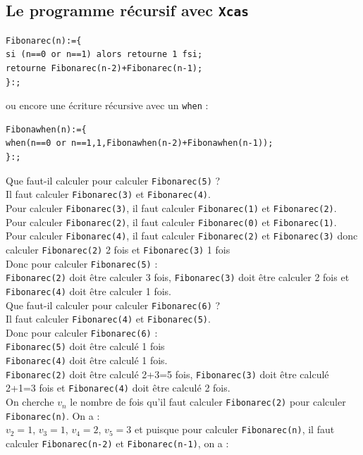 \documentclass[a4paper,11pt]{book}
\begin{document}
\subsection{Le programme r\'ecursif avec {\tt Xcas}}
\begin{verbatim}
Fibonarec(n):={
si (n==0 or n==1) alors retourne 1 fsi;
retourne Fibonarec(n-2)+Fibonarec(n-1);
}:;
\end{verbatim}
ou encore une \'ecriture r\'ecursive avec un {\tt when} :
\begin{verbatim}
Fibonawhen(n):={
when(n==0 or n==1,1,Fibonawhen(n-2)+Fibonawhen(n-1));
}:;
\end{verbatim}
Que faut-il calculer pour calculer {\tt Fibonarec(5)} ?\\
Il faut calculer {\tt Fibonarec(3)} et  {\tt Fibonarec(4)}.\\
Pour calculer {\tt Fibonarec(3)}, il faut calculer {\tt Fibonarec(1)} et  {\tt Fibonarec(2)}.\\
Pour calculer {\tt Fibonarec(2)}, il faut calculer {\tt Fibonarec(0)} et  {\tt Fibonarec(1)}.\\
Pour calculer {\tt Fibonarec(4)}, il faut calculer {\tt Fibonarec(2)} et  {\tt Fibonarec(3)} donc
calculer {\tt Fibonarec(2)} 2 fois et {\tt Fibonarec(3)} 1 fois\\
Donc pour calculer {\tt Fibonarec(5)} :\\
{\tt Fibonarec(2)} doit \^etre calculer 3 fois, {\tt Fibonarec(3)} doit \^etre 
calculer 2 fois et {\tt Fibonarec(4)} doit \^etre calculer 1 fois.\\
Que faut-il calculer pour calculer {\tt Fibonarec(6)} ?\\
Il faut calculer {\tt Fibonarec(4)} et  {\tt Fibonarec(5)}.\\
Donc  pour calculer {\tt Fibonarec(6)} :\\
{\tt Fibonarec(5)} doit \^etre calculé 1 fois \\
{\tt Fibonarec(4)} doit \^etre calculé 1 fois.\\
{\tt Fibonarec(2)} doit \^etre calculé 2+3=5 fois, {\tt Fibonarec(3)} doit \^etre 
calculé 2+1=3 fois et {\tt Fibonarec(4)} doit \^etre calculé 2 fois.\\
On cherche $v_n$ le nombre de fois qu'il faut calculer 
{\tt Fibonarec(2)} pour calculer {\tt Fibonarec(n)}.
On a :\\
$v_2=1$, $v_3=1$, $v_4=2$, $v_5=3$ et
puisque pour calculer {\tt Fibonarec(n)}, il faut calculer {\tt Fibonarec(n-2)} et 
{\tt Fibonarec(n-1)}, on a :\\
\end{document}
